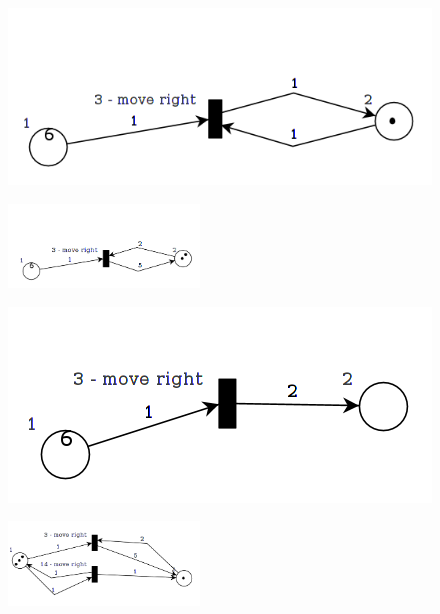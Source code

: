 \documentclass[12pt,a4paper,twocolumn]{article}
\begin{document}
  \begin{figure}
\includegraphics[scale=0.3]{PetriNet_1_1}

\end{figure}
\vspace{-5ex}
\begin{figure}
\includegraphics[scale=0.3,width=2in]{PetriNet_1_2}

\end{figure}
  \begin{figure}
\includegraphics[scale=0.3]{PetriNet_1_3}
\vspace{-5ex}
\end{figure}
 \begin{figure}
\includegraphics[scale=0.3, width=2in]{PetriNet_1_4}

\end{figure}
\end{document}
